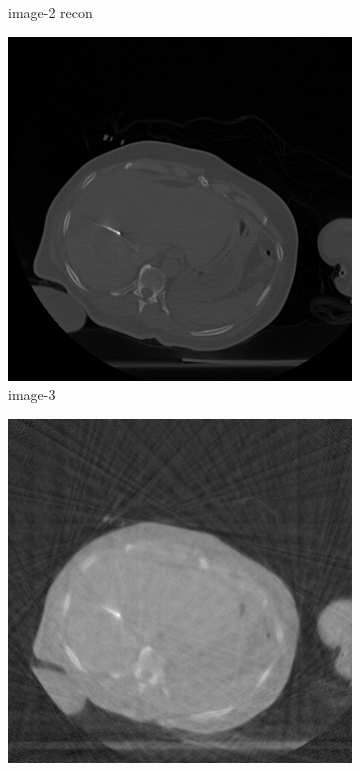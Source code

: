\documentclass[journal]{IEEEtran}
\begin{document}
\begin{figure}[!h]
\begin{subfigure}[b]{0.24\linewidth}
\captionsetup{labelformat=empty}       
 \caption{image-2 recon}
    \end{subfigure}
 \begin{subfigure}[b]{0.24\linewidth}
        \includegraphics[width=\textwidth]{../images/tmh/RFA2/template3.png}
\captionsetup{labelformat=empty}       
 \caption{image-3}
    \end{subfigure}
       \begin{subfigure}[b]{0.24\linewidth}
        \includegraphics[width=\textwidth]{../images/tmh/RFA2/new_protocol/result_image_3.png}

\end{subfigure}
\end{figure}
\end{document}
